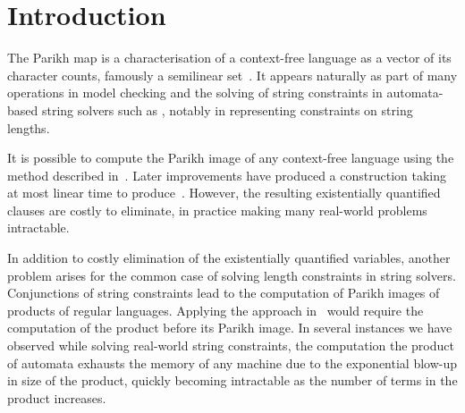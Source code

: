 \documentclass[acmsmall,review,anonymous]{acmart}\settopmatter{printfolios=true,printccs=false,printacmref=true}
\theoremstyle{definition}
\begin{document}




\maketitle


\section{Introduction}

The Parikh map is a characterisation of a context-free language as a vector of
its character counts, famously a semilinear set~\cite{parikh-theorem}. It
appears naturally as part of many operations in model checking and the solving
of string constraints in automata-based string solvers such as \Ostrich{},
notably in representing constraints on string lengths.

It is possible to compute the Parikh image of any context-free language using
the method described in~\cite{generate-parikh-image}. Later improvements have
produced a construction taking at most linear time to
produce~\cite{muscholl-linear}. However, the resulting existentially quantified
clauses are costly to eliminate, in practice making many real-world problems
intractable.

In addition to costly elimination of the existentially quantified variables,
another problem arises for the common case of solving length constraints in
string solvers. Conjunctions of string constraints lead to the computation of
Parikh images of products of regular languages. Applying the approach
in~\cite{generate-parikh-image} would require the computation of the product
before its Parikh image. In several instances we have observed while solving
real-world string constraints, the computation the product of automata exhausts
the memory of any machine due to the exponential blow-up in size of the product,
quickly becoming intractable as the number of terms in the product increases.
\end{document}
